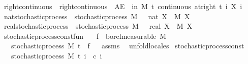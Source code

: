 \begin{isabellebody}
\isamarkupfalse%
\ right{\isacharunderscore}{\kern0pt}continuous\ \ {\isachardoublequoteopen}right{\isacharunderscore}{\kern0pt}continuous\ {\isacharequal}{\kern0pt}\ {\isacharparenleft}{\kern0pt}AE\ {\isasymxi}\ in\ M{\isachardot}{\kern0pt}\ {\isasymforall}t{\isachardot}{\kern0pt}\ continuous\ {\isacharparenleft}{\kern0pt}at{\isacharunderscore}{\kern0pt}right\ t{\isacharparenright}{\kern0pt}\ {\isacharparenleft}{\kern0pt}{\isasymlambda}i{\isachardot}{\kern0pt}\ X\ i\ {\isasymxi}{\isacharparenright}{\kern0pt}{\isacharparenright}{\kern0pt}{\isachardoublequoteclose}\isanewline
\isanewline
{}\isamarkupfalse%
\isanewline
\isanewline
{}\isamarkupfalse%
\ nat{\isacharunderscore}{\kern0pt}stochastic{\isacharunderscore}{\kern0pt}process\ {\isacharequal}{\kern0pt}\ stochastic{\isacharunderscore}{\kern0pt}process\ M\ {\isachardoublequoteopen}{}\ {\isacharcolon}{\kern0pt}{\isacharcolon}{\kern0pt}\ nat{\isachardoublequoteclose}\ X\ \ M\ X\isanewline
{}\isamarkupfalse%
\ real{\isacharunderscore}{\kern0pt}stochastic{\isacharunderscore}{\kern0pt}process\ {\isacharequal}{\kern0pt}\ stochastic{\isacharunderscore}{\kern0pt}process\ M\ {\isachardoublequoteopen}{}\ {\isacharcolon}{\kern0pt}{\isacharcolon}{\kern0pt}\ real{\isachardoublequoteclose}\ X\ \ M\ X\isanewline
\isanewline
{}\isamarkupfalse%
\ stochastic{\isacharunderscore}{\kern0pt}process{\isacharunderscore}{\kern0pt}const{\isacharunderscore}{\kern0pt}fun{\isacharcolon}{\kern0pt}\isanewline
\ \ \ {\isachardoublequoteopen}f\ {\isasymin}\ borel{\isacharunderscore}{\kern0pt}measurable\ M{\isachardoublequoteclose}\isanewline
\ \ \ {\isachardoublequoteopen}stochastic{\isacharunderscore}{\kern0pt}process\ M\ t\ {\isacharparenleft}{\kern0pt}{\isasymlambda}{\isacharunderscore}{\kern0pt}{\isachardot}{\kern0pt}\ f{\isacharparenright}{\kern0pt}{\isachardoublequoteclose}%
\isadelimproof
\ %
\endisadelimproof
%
\isatagproof
{}\isamarkupfalse%
\ assms\ \isamarkupfalse%
\ {\isacharparenleft}{\kern0pt}unfold{\isacharunderscore}{\kern0pt}locales{\isacharparenright}{\kern0pt}%
\endisatagproof
{\isafoldproof}%
%
\isadelimproof
%
\endisadelimproof
\isanewline
\isanewline
{}\isamarkupfalse%
\ stochastic{\isacharunderscore}{\kern0pt}process{\isacharunderscore}{\kern0pt}const{\isacharcolon}{\kern0pt}\isanewline
\ \ \ {\isachardoublequoteopen}stochastic{\isacharunderscore}{\kern0pt}process\ M\ t\ {\isacharparenleft}{\kern0pt}{\isasymlambda}i\ {\isacharunderscore}{\kern0pt}{\isachardot}{\kern0pt}\ c\ i{\isacharparenright}{\kern0pt}{\isachardoublequoteclose}%

\end{isabellebody}
